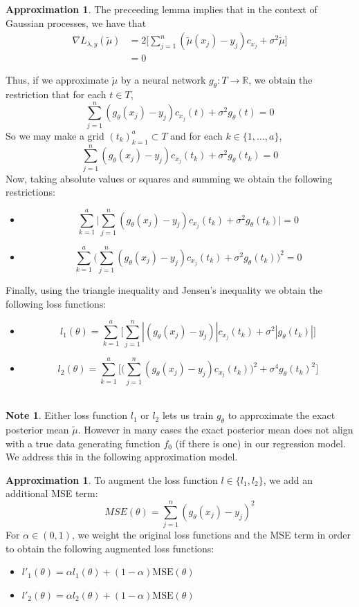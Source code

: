 \documentclass{article}
\theoremstyle{definition}
\newtheorem{note}[definition]{Note}
\newtheorem{apprx}[definition]{Approximation}
\newcommand{\al}{\alpha}
\newcommand{\lam}{\lambda}
\newcommand{\sig}{\sigma}
\newcommand{\R}{\mathbb{R}}
\begin{document}
\begin{apprx}
The preceeding lemma implies that in the context of Gaussian processes, we have that 
\begin{align*}
\nabla L_{\lam, y}(\tilde{\mu}) 
&= 2\bigg [ \sum_{j=1}^n (\tilde{\mu}(x_j)- y_j) c_{x_j} + \sig^2 \tilde{\mu} \bigg ] \\
&= 0
\end{align*}

Thus, if we approximate $\tilde{\mu}$ by a neural network $g_{\theta}:T \rightarrow \R$, we obtain the restriction that for each $t \in T$, 
$$\sum_{j=1}^n (g_{\theta}(x_j)- y_j) c_{x_j}(t) + \sig^2 g_{\theta}(t) = 0$$ 
So we may make a grid $(t_k)_{k=1}^a \subset T$ and for each $k \in \{1, \ldots, a\}$, 
 $$\sum_{j=1}^n (g_{\theta}(x_j)- y_j) c_{x_j}(t_k) + \sig^2 g_{\theta}(t_k) = 0$$ 
 Now, taking absolute values or squares and summing we obtain the following restrictions: 
 \begin{itemize}
 \item $$\sum_{k=1}^a \bigg |\sum_{j=1}^n (g_{\theta}(x_j)- y_j) c_{x_j}(t_k) + \sig^2 g_{\theta}(t_k) \bigg| = 0$$ 
 \item $$\sum_{k=1}^a \bigg (\sum_{j=1}^n (g_{\theta}(x_j)- y_j) c_{x_j}(t_k) + \sig^2 g_{\theta}(t_k) \bigg)^2 = 0$$
\end{itemize}  
Finally, using the triangle inequality and Jensen's inequality we obtain the following loss functions:
\begin{itemize}
\item $$l_1(\theta) = \sum_{k=1}^a \bigg[ \sum_{j=1}^n |(g_{\theta}(x_j)- y_j)| c_{x_j}(t_k) + \sig^2 |g_{\theta}(t_k)| \bigg] $$ 
\item $$l_2(\theta) = \sum\limits_{k=1}^a \bigg[ \bigg (\sum\limits_{j=1}^n (g_{\theta}(x_j) - y_j)c_{x_j}(t_k)\bigg)^2 + \sig^4 g_{\theta}(t_k)^2\bigg]$$\\
\end{itemize}
\end{apprx}

\begin{note}
Either loss function $l_1$ or $l_2$ lets us train $g_{\theta}$ to approximate the exact posterior mean $\tilde{\mu}$. However in many cases the exact posterior mean does not align with a true data generating function $f_0$ (if there is one) in our regression model. We address this in the following approximation model.
\end{note}
\newpage

\begin{apprx}
To augment the loss function $l \in \{l_1, l_2\}$, we add an additional MSE term: 
$$MSE(\theta) = \sum_{j=1}^n (g_{\theta}(x_j) - y_j)^2$$ For $\al \in (0,1)$, we weight the original loss functions and the MSE term in order to obtain the following augmented loss functions:
\begin{itemize}
\item $l'_1(\theta) = \al l_1(\theta) + (1-\al) \text{MSE}(\theta)$\\
\item $l'_2(\theta) = \al l_2(\theta) + (1-\al) \text{MSE}(\theta)$\\
\end{itemize}
\end{apprx}
\end{document}
